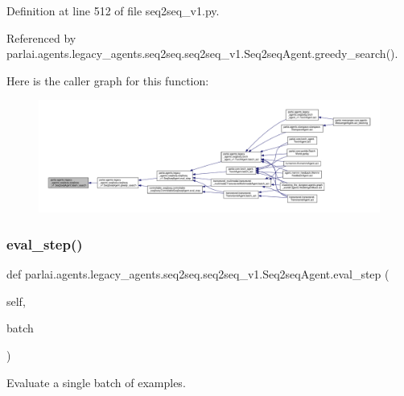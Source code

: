 Definition at line 512 of file seq2seq\+\_\+v1.\+py.



Referenced by parlai.\+agents.\+legacy\+\_\+agents.\+seq2seq.\+seq2seq\+\_\+v1.\+Seq2seq\+Agent.\+greedy\+\_\+search().

Here is the caller graph for this function\+:
\nopagebreak
\begin{figure}[H]
\begin{center}
\leavevmode
\includegraphics[width=350pt]{classparlai_1_1agents_1_1legacy__agents_1_1seq2seq_1_1seq2seq__v1_1_1Seq2seqAgent_a58227903fd44e3d436710c06457c8f84_icgraph}
\end{center}
\end{figure}
\mbox{\label{classparlai_1_1agents_1_1legacy__agents_1_1seq2seq_1_1seq2seq__v1_1_1Seq2seqAgent_ad06de7c94ee40c403f792e7b48e0b137}} 
\subsubsection{\texorpdfstring{eval\+\_\+step()}{eval\_step()}}
{\footnotesize\ttfamily def parlai.\+agents.\+legacy\+\_\+agents.\+seq2seq.\+seq2seq\+\_\+v1.\+Seq2seq\+Agent.\+eval\+\_\+step (\begin{DoxyParamCaption}\item[{}]{self,  }\item[{}]{batch }\end{DoxyParamCaption})}

\begin{DoxyVerb}Evaluate a single batch of examples.\end{DoxyVerb}
 

